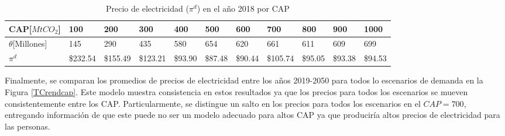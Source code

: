 \begin{table}[H]
\begin{footnotesize}
    \centering
    \begin{tabular}{|l|l|l|l|l|l|l|l|l|l|l|}
    \hline
        CAP[$MtCO_2$] & 100 & 200 & 300 & 400 & 500 & 600 & 700 & 800 & 900 & 1000 \\ \hline
       $\theta$[Millones]  & 145  & 290  & 435  & 580  & 654  & 620  & 661  & 611  & 609  & 699  \\ \hline
        $\pi^d$  &  \$232.54   &  \$155.49   &  \$123.21   &  \$93.90   &  \$87.48   &  \$90.44   &  \$105.74   &  \$95.05   &  \$93.38   &  \$94.53   \\ \hline
    \end{tabular}
    \caption{{\footnotesize Precio de electricidad ($\pi^d$) en el año 2018 por CAP }}
    \label{TCpidporcap}
\end{footnotesize}
\end{table}


Finalmente, se comparan los promedios de precios de electricidad entre los años 2019-2050 para todos lo escenarios de demanda en la Figura \ref{TCrendcap}. Este modelo muestra consistencia en estos resultados ya que los precios para todos los escenarios se mueven consistentemente entre los CAP. Particularmente, se distingue un salto en los precios para todos los escenarios en el $CAP=700$, entregando información de que este puede no ser un modelo adecuado para altos CAP ya que produciría altos precios de electricidad para las personas. 

